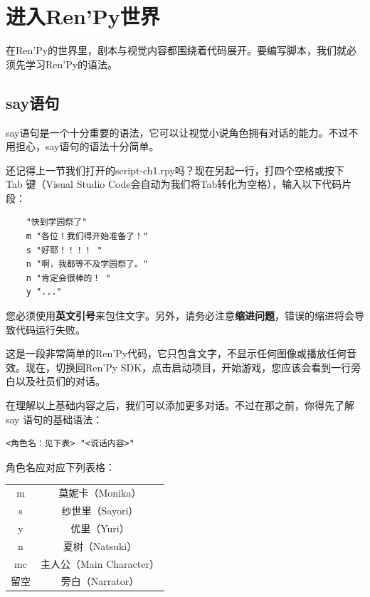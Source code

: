 \documentclass[../../Main.tex]{subfiles}
\begin{document}
\section{进入Ren'Py世界}
在Ren'Py的世界里，剧本与视觉内容都围绕着代码展开。要编写脚本，我们就必须先学习Ren'Py的语法。
\subsection{say语句}\label{subsec:2.2.1}
say语句是一个十分重要的语法，它可以让视觉小说角色拥有对话的能力。不过不用担心，say语句的语法十分简单。

还记得上一节我们打开的script-ch1.rpy吗？现在另起一行，打四个空格或按下 Tab 键（Visual Studio Code会自动为我们将Tab转化为空格），输入以下代码片段：

\begin{lstlisting}
    "快到学园祭了"
    m "各位！我们得开始准备了！"
    s "好耶！！！！ "
    n "啊，我都等不及学园祭了。"
    n "肯定会很棒的！ "
    y "..."
\end{lstlisting}

\begin{Warning}
您必须使用\textbf{英文引号}来包住文字。另外，请务必注意\textbf{缩进问题}，错误的缩进将会导致代码运行失败。
\end{Warning}

这是一段非常简单的Ren'Py代码，它只包含文字，不显示任何图像或播放任何音效。现在，切换回Ren'Py SDK，点击启动项目，开始游戏，您应该会看到一行旁白以及社员们的对话。

在理解以上基础内容之后，我们可以添加更多对话。不过在那之前，你得先了解 say 语句的基础语法：

\begin{lstlisting}[numbers=none]
<角色名：见下表> "<说话内容>"
\end{lstlisting}


角色名应对应下列表格：

\begin{center}
    \tabletail{\hline}
    \tablelasttail{\hline}
    \begin{supertabular}{|c|c|}
        \hline
        m & 莫妮卡（Monika）\\
        s & 纱世里（Sayori）\\
        y & 优里（Yuri）\\
        n & 夏树（Natsuki）\\
        mc & 主人公（Main Character）\\
        留空 & 旁白（Narrator）\\
        \hline
    \end{supertabular}
\end{center}
\end{document}
